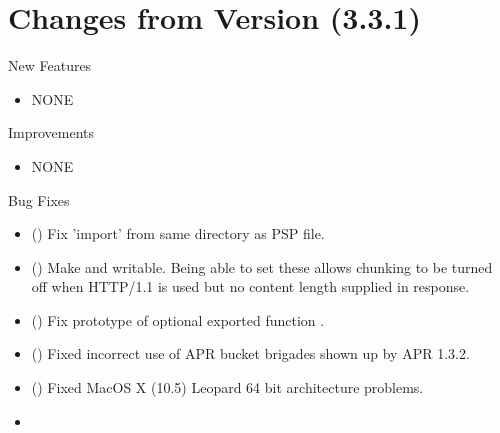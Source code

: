 %
%
%
\chapter{Changes from Version (3.3.1)\label{app-changes-from-3.3.1}}


  New Features

  \begin{itemize}
    \item
      NONE
  \end{itemize}

  Improvements

  \begin{itemize}
    \item
      NONE
  \end{itemize}

  Bug Fixes

  \begin{itemize}
  \item
      ()
      Fix 'import' from same directory as PSP file.
  \item
      ()
      Make  and  writable.
      Being able to set these allows chunking to be turned off when HTTP/1.1
      is used but no content length supplied in response.
  \item
      ()
      Fix prototype of optional exported function
      .
  \item
      ()
      Fixed incorrect use of APR bucket brigades shown up by APR 1.3.2.
  \item
      ()
      Fixed MacOS X (10.5) Leopard 64 bit architecture problems.
    \item
  \end{itemize}

